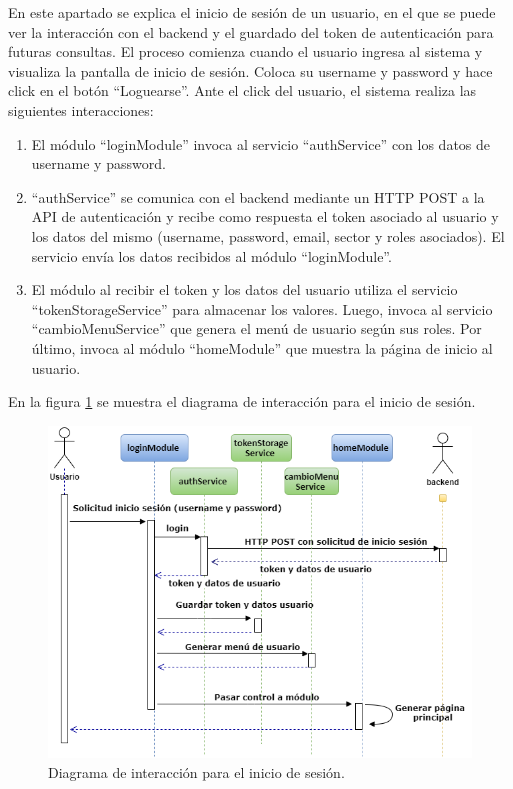 En este apartado se explica el inicio de sesión de un usuario, en el que se puede ver la interacción con el backend y el guardado del token de autenticación para futuras consultas.
El proceso comienza cuando el usuario ingresa al sistema y visualiza la pantalla de inicio de sesión. Coloca su username y password y hace click en el botón “Loguearse”. Ante el click del usuario, el sistema realiza las siguientes interacciones:

\begin{enumerate}
\item El módulo ``loginModule'' invoca al servicio ``authService'' con los datos de username y password.
\item ``authService'' se comunica con el backend mediante un HTTP POST a la API de autenticación y recibe como respuesta el token asociado al usuario y los datos del mismo (username, password, email, sector y roles asociados). El servicio envía los datos recibidos al módulo ``loginModule''.
\item El módulo al recibir el token y los datos del usuario utiliza el servicio ``tokenStorageService'' para almacenar los valores. Luego, invoca al servicio ``cambioMenuService'' que genera el menú de usuario según sus roles. Por último, invoca al módulo ``homeModule'' que muestra la página de inicio al usuario. 
\end{enumerate}

En la figura \ref{fig:inisioSesionInteraccion} se muestra el diagrama de interacción para el inicio de sesión.

\begin{figure}[ht]
	\centering
	\includegraphics[width=1\textwidth]{./Figures/inisioSesionInteraccion.png}
	\caption{Diagrama de interacción para el inicio de sesión.}
	\label{fig:inisioSesionInteraccion}
\end{figure}

